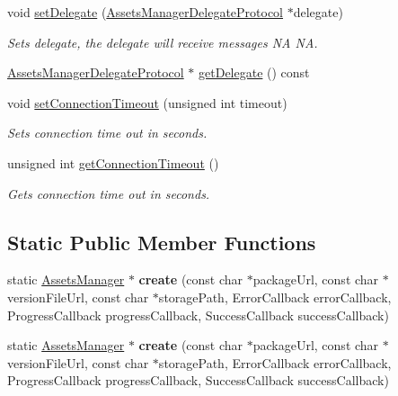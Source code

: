 \begin{DoxyCompactItemize}
void \hyperlink{classAssetsManager_a3a146a72ce6e481f8833cce8e007b881}{set\+Delegate} (\hyperlink{classAssetsManagerDelegateProtocol}{Assets\+Manager\+Delegate\+Protocol} $\ast$delegate)
\begin{DoxyCompactList}\small\item\em Sets delegate, the delegate will receive messages  NA  NA. \end{DoxyCompactList}\item 
\hyperlink{classAssetsManagerDelegateProtocol}{Assets\+Manager\+Delegate\+Protocol} $\ast$ \hyperlink{classAssetsManager_a297c23ec228e1885904f9ab9864a4d65}{get\+Delegate} () const
\item 
\mbox{\label{classAssetsManager_a577f7023974b3ff2ba8331311354688b}} 
void \hyperlink{classAssetsManager_a577f7023974b3ff2ba8331311354688b}{set\+Connection\+Timeout} (unsigned int timeout)
\begin{DoxyCompactList}\small\item\em Sets connection time out in seconds. \end{DoxyCompactList}\item 
\mbox{\label{classAssetsManager_a7507fe3047a85bd861c02b95f54c1dd2}} 
unsigned int \hyperlink{classAssetsManager_a7507fe3047a85bd861c02b95f54c1dd2}{get\+Connection\+Timeout} ()
\begin{DoxyCompactList}\small\item\em Gets connection time out in seconds. \end{DoxyCompactList}\end{DoxyCompactItemize}
\subsection*{Static Public Member Functions}
\begin{DoxyCompactItemize}
\item 
\mbox{\label{classAssetsManager_a49e8c569c25784537dac60ebacc7969b}} 
static \hyperlink{classAssetsManager}{Assets\+Manager} $\ast$ {\bfseries create} (const char $\ast$package\+Url, const char $\ast$version\+File\+Url, const char $\ast$storage\+Path, Error\+Callback error\+Callback, Progress\+Callback progress\+Callback, Success\+Callback success\+Callback)
\item 
\mbox{\label{classAssetsManager_a48c90dcbed3c23dee97eeaeaabdedc72}} 
static \hyperlink{classAssetsManager}{Assets\+Manager} $\ast$ {\bfseries create} (const char $\ast$package\+Url, const char $\ast$version\+File\+Url, const char $\ast$storage\+Path, Error\+Callback error\+Callback, Progress\+Callback progress\+Callback, Success\+Callback success\+Callback)
\end{DoxyCompactItemize}
